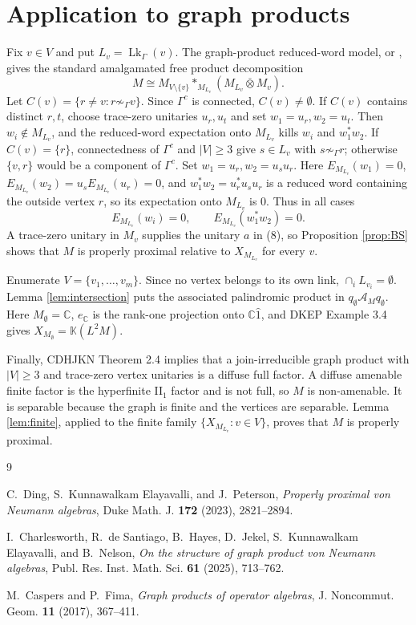 \documentclass[12pt]{article}
\DeclareMathOperator{\Lk}{Lk}
\newcommand{\bbarotimes}{\mathbin{\overline{\otimes}}}
\newcommand{\cA}{\mathcal A}
\newcommand{\C}{\mathbb C}
\begin{document}
\section*{Application to graph products}

Fix \(v\in V\) and put \(L_v=\Lk_\Gamma(v)\).  The graph-product reduced-word
model, or \cite{CF17}, gives the standard amalgamated free product
decomposition
\[
        M\cong M_{V\setminus\{v\}}*_{M_{L_v}}
        (M_{L_v}\bbarotimes M_v).                                \tag{8}
\]
Let \(C(v)=\{r\ne v:r\not\sim_\Gamma v\}\).  Since \(\Gamma^c\) is connected,
\(C(v)\ne\emptyset\).  If \(C(v)\) contains distinct \(r,t\), choose trace-zero
unitaries \(u_r,u_t\) and set \(w_1=u_r,w_2=u_t\).  Then \(w_i\notin M_{L_v}\),
and the reduced-word expectation onto \(M_{L_v}\) kills \(w_i\) and
\(w_1^*w_2\).  If \(C(v)=\{r\}\), connectedness of \(\Gamma^c\) and
\(|V|\ge3\) give \(s\in L_v\) with \(s\not\sim_\Gamma r\); otherwise
\(\{v,r\}\) would be a component of \(\Gamma^c\).  Set
\(w_1=u_r,w_2=u_su_r\).  Here \(E_{M_{L_v}}(w_1)=0\),
\(E_{M_{L_v}}(w_2)=u_sE_{M_{L_v}}(u_r)=0\), and
\(w_1^*w_2=u_r^*u_su_r\) is a reduced word containing the outside vertex \(r\),
so its expectation onto \(M_{L_v}\) is \(0\).  Thus in all cases
\[
        E_{M_{L_v}}(w_i)=0,\qquad E_{M_{L_v}}(w_1^*w_2)=0 .
\]
A trace-zero unitary in \(M_v\) supplies the unitary \(a\) in (8), so
Proposition \ref{prop:BS} shows that \(M\) is properly proximal relative to
\(X_{M_{L_v}}\) for every \(v\).

Enumerate \(V=\{v_1,\ldots,v_m\}\).  Since no vertex belongs to its own link,
\(\cap_i L_{v_i}=\emptyset\).  Lemma \ref{lem:intersection} puts the associated
palindromic product in \(q_\emptyset\cA_Mq_\emptyset\).  Here
\(M_\emptyset=\C\), \(e_\C\) is the rank-one projection onto
\(\C\widehat1\), and DKEP Example 3.4 gives
\(X_{M_\emptyset}=\mathbb K(L^2M)\).

Finally, CDHJKN Theorem 2.4 implies that a join-irreducible graph product with
\(|V|\ge3\) and trace-zero vertex unitaries is a diffuse full factor.  A
diffuse amenable finite factor is the hyperfinite II\(_1\) factor and is not
full, so \(M\) is non-amenable.  It is separable because the graph is finite
and the vertices are separable.  Lemma \ref{lem:finite}, applied to the finite
family \(\{X_{M_{L_v}}:v\in V\}\), proves that \(M\) is properly proximal.

\begin{thebibliography}{9}

C.~Ding, S.~Kunnawalkam Elayavalli, and J.~Peterson,
\emph{Properly proximal von Neumann algebras},
Duke Math. J. \textbf{172} (2023), 2821--2894.

I.~Charlesworth, R.~de Santiago, B.~Hayes, D.~Jekel,
S.~Kunnawalkam Elayavalli, and B.~Nelson,
\emph{On the structure of graph product von Neumann algebras},
Publ. Res. Inst. Math. Sci. \textbf{61} (2025), 713--762.

M.~Caspers and P.~Fima,
\emph{Graph products of operator algebras},
J. Noncommut. Geom. \textbf{11} (2017), 367--411.

\end{thebibliography}
\end{document}
